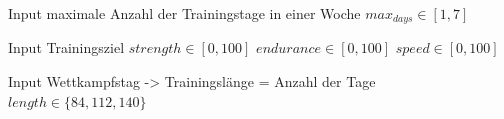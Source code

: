         Input maximale Anzahl der Trainingstage in einer Woche
        $max_{days} \in [1, 7]$
        
        Input Trainingsziel
        $strength \in [0, 100]$
        $endurance \in [0, 100]$        
        $speed \in [0, 100]$
                
        Input Wettkampfstag -> Trainingslänge = Anzahl der Tage
        $length \in \{ 84, 112, 140\} $ 
        
    
        
        


